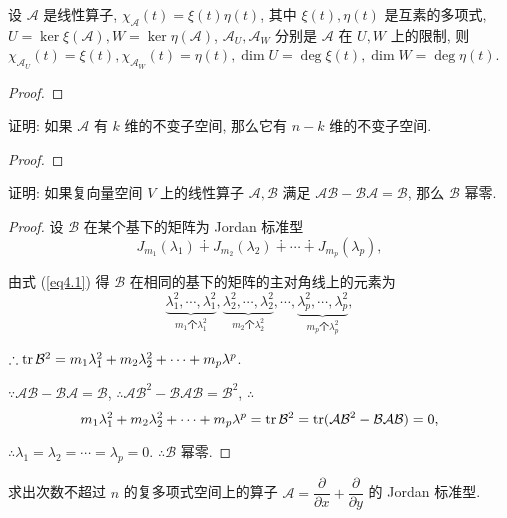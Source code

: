 \documentclass[color=black,device=normal,lang=cn,mode=geye]{elegantnote}
\begin{document}
\begin{exercisec}[2.5.1]
    设 $\mathcal{A}$ 是线性算子, $\chi_{\mathcal{A}}(t)=\xi(t)\eta(t)$, 其中 $\xi(t),\eta(t)$ 是互素的多项式, $U=\ker\xi(\mathcal{A}),W=\ker\eta(\mathcal{A})$, $\mathcal{A}_U,\mathcal{A}_W$ 分别是 $\mathcal{A}$ 在 $U,W$ 上的限制, 则 $\chi_{\mathcal{A}_U}(t)=\xi(t),\chi_{\mathcal{A}_W}(t)=\eta(t),\dim U=\deg\xi(t),\dim W=\deg\eta(t)$.
\end{exercisec}
\begin{proof}
\end{proof}
\begin{exercisec}[2.5.2]
    证明: 如果 $\mathcal{A}$ 有 $k$ 维的不变子空间, 那么它有 $n-k$ 维的不变子空间.
\end{exercisec}
\begin{proof}
\end{proof}
\begin{exercisec}[2.5.16]
    证明: 如果复向量空间 $V$ 上的线性算子 $\mathcal{A},\mathcal{B}$ 满足 $\mathcal{AB}-\mathcal{BA}=\mathcal{B}$, 那么 $\mathcal{B}$ 幂零.
\end{exercisec}
\begin{proof}
    设 $\mathcal{B}$ 在某个基下的矩阵为 Jordan 标准型
    \[J_{m_1}(\lambda_1)\dotplus J_{m_2}(\lambda_2)\dotplus\cdots\dotplus J_{m_p}(\lambda_p),\]

    由式 (\ref{eq4.1}) 得 $\mathcal{B}$ 在相同的基下的矩阵的主对角线上的元素为
    \[\underbrace{\lambda_1^2,\cdots,\lambda_1^2}_{m_1\text{个}\lambda_1^2},\underbrace{\lambda_2^2,\cdots,\lambda_2^2}_{m_2\text{个}\lambda_2^2},\cdots,\underbrace{\lambda_p^2,\cdots,\lambda_p^2}_{m_p\text{个}\lambda_p^2},\]
    
    $\therefore\operatorname{tr}\mathcal{B}^2=m_1\lambda_1^2+m_2\lambda_2^2+\cdots+m_p\lambda^p$.

    $\because\mathcal{AB}-\mathcal{BA}=\mathcal{B}$, $\therefore\mathcal{AB}^2-\mathcal{BAB}=\mathcal{B}^2$, $\therefore$
    \[m_1\lambda_1^2+m_2\lambda_2^2+\cdots+m_p\lambda^p=\operatorname{tr}\mathcal{B}^2=\operatorname{tr}(\mathcal{AB}^2-\mathcal{BAB})=0,\]

    $\therefore\lambda_1=\lambda_2=\cdots=\lambda_p=0$. $\therefore\mathcal{B}$ 幂零.
\end{proof}
\begin{exercisec}[2.5.17]
    求出次数不超过 $n$ 的复多项式空间上的算子 $\mathcal{A}=\dfrac{\partial}{\partial x}+\dfrac{\partial}{\partial y}$ 的 Jordan 标准型.
\end{exercisec}
\begin{solution}
\end{solution}
\end{document}
